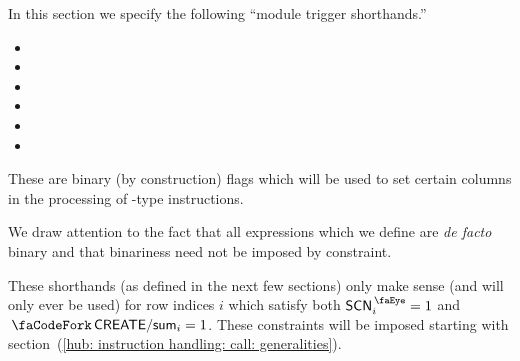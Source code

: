 In this section we specify the following ``module trigger shorthands.''
\begin{multicols}{2}
\begin{itemize}
	\item \locCallTriggersMxp{}
	\item \locCallTriggersTrm{}
	\item \locCallTriggersStp{}
	\item \locCallTriggersOob{}
	\item \locCallTriggersRomLex{}
	\item[\vspace{\fill}]
\end{itemize}
\end{multicols}
\noindent These are binary (by construction) flags which will be used to set certain columns in the processing of -type instructions.

\saNote{} We draw attention to the fact that all  expressions which we define are \emph{de facto} binary and that binariness need not be imposed by constraint.

\saNote{} These shorthands (as defined in the next few sections) only make sense (and will only ever be used) for row indices $i$ which satisfy both $\peekScenario_{i} = 1$ and $\scenCreateSum_{i} = 1$. These constraints will be imposed starting with section~(\ref{hub: instruction handling: call: generalities}).
